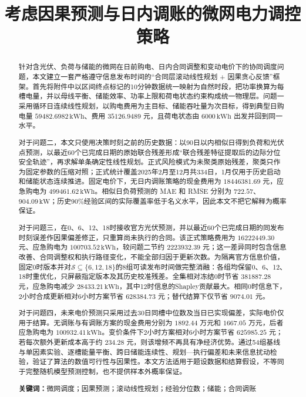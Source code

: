 \documentclass[UTF8,12pt,a4paper]{ctexart}
\title{考虑因果预测与日内调账的微网电力调控策略}
\author{}
\date{}
\newcommand{\keywords}[1]{\par\vspace{0.6em}\noindent\textbf{关键词：}#1}
\begin{document}
\maketitle
\thispagestyle{plain}
\begin{abstract}
针对含光伏、负荷与储能的微网在日前购电、日内合同调整和变动电价下的协同调度问题，本文建立一套严格遵守信息发布时间的“合同层滚动线性规划 + 因果贪心反馈”框架。首先将附件中以区间终点标记的10分钟数据统一映射为自然时段，把功率换算为每槽电量，并以母线平衡、储能效率、功率上限和荷电状态约束构成统一物理层。问题一采用循环日连续线性规划，以购电费用为主目标、储能吞吐量为次目标，得到典型日购电量 $59482.6982\,\mathrm{kWh}$、费用 $35126.9489$ 元，且荷电状态由 $6000\,\mathrm{kWh}$ 出发并回到同一水平。

对于问题二，本文只使用决策时刻之前的历史数据：以90日以内相似日得到负荷和光伏点预测，以最近60个已完成日期的原始联合残差形成“联合残差特征提取后的边际分位安全轨迹”，再求解单条确定性线性规划。正式风险模式为未聚类原始残差，聚类只作为固定参数的压缩对照；正式统计覆盖2025年2月至12月共334日，1月仅用于历史启动和储能状态连续推进。固定电价下，无日内调账策略的现金费用为 $18446381.69$ 元，应急购电为 $499461.62\,\mathrm{kWh}$。相似日负荷预测的 MAE 和 RMSE 分别为 $722.57$、$904.09\,\mathrm{kW}$；历史90\%经验区间的实际覆盖率低于名义水平，因此本文不把它解释为概率保证。

对于问题三，在0、6、12、18时接收官方光伏预测，并以最近60个已完成日期的同发布时刻误差作因果偏差修正，只重算尚未执行的合同。该正式策略费用为 $16222449.30$ 元、应急购电为 $100703.52\,\mathrm{kWh}$，较问题二节约 $2223932.39$ 元；这一差异同时包含信息改善、合同调整权和执行路径变化，不能全部归因于更新次数。为隔离官方信息价值，固定0时版本并对\(\mathcal S\subseteq\{6,12,18\}\)的8组可读发布时间做完整消融：各组均保留0、6、12、18时重优化，只屏蔽指定版本及其历史校准残差。全集相对冻结0时节省 $381887.28$ 元，应急购电减少 $28433.21\,\mathrm{kWh}$，其中12时信息的Shapley贡献最大。相同0时信息下，2小时合成更新相对6小时方案节省 $628384.73$ 元；替代结算下仅节省 $9074.01$ 元。

对于问题四，未来电价预测只采用过去30日同槽中位数及当日已实现偏差，实际电价仅用于结算。无调账与有调账方案的现金费用分别为 $1892.44$ 万元和 $1667.05$ 万元，后者应急购电为 $100932.41\,\mathrm{kWh}$。变价条件下2小时方案相对6小时方案节省 $625985.25$ 元；若每次额外更新成本高于约 $234.28$ 元，则该增频不再具有净经济优势。通过54组基线与单因素实验、逐槽能量平衡、跨日储能连续性、规划—执行偏差和未来信息扰动检验，验证了算法的数值可行性与因果性。本文方法适用于题设数据和结算假设，不等同于完整随机模型预测控制，也不提供样本外概率保证。

\keywords{微网调度；因果预测；滚动线性规划；经验分位数；储能；合同调账}
\end{abstract}
\clearpage
\setcounter{page}{2}











\appendix



\end{document}
